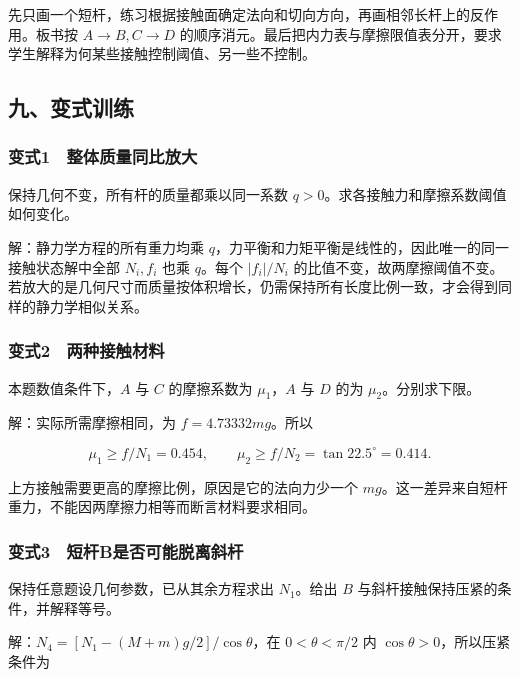 \documentclass[12pt,a4paper,fontset=fandol]{ctexart}
\begin{document}
先只画一个短杆，练习根据接触面确定法向和切向方向，再画相邻长杆上的反作用。板书按
\(A\to B,C\to D\)
的顺序消元。最后把内力表与摩擦限值表分开，要求学生解释为何某些接触控制阈值、另一些不控制。

\subsection{九、变式训练}\label{ux4e5dux53d8ux5f0fux8badux7ec3-3}

\subsubsection{变式1　整体质量同比放大}\label{ux53d8ux5f0f1-ux6574ux4f53ux8d28ux91cfux540cux6bd4ux653eux5927}

保持几何不变，所有杆的质量都乘以同一系数
\(q>0\)。求各接触力和摩擦系数阈值如何变化。

解：静力学方程的所有重力均乘
\(q\)，力平衡和力矩平衡是线性的，因此唯一的同一接触状态解中全部
\(N_i,f_i\) 也乘 \(q\)。每个 \(|f_i|/N_i\)
的比值不变，故两摩擦阈值不变。若放大的是几何尺寸而质量按体积增长，仍需保持所有长度比例一致，才会得到同样的静力学相似关系。

\subsubsection{变式2　两种接触材料}\label{ux53d8ux5f0f2-ux4e24ux79cdux63a5ux89e6ux6750ux6599}

本题数值条件下，\(A\) 与 \(C\) 的摩擦系数为 \(\mu_1\)，\(A\) 与 \(D\)
的为 \(\mu_2\)。分别求下限。

解：实际所需摩擦相同，为 \(f=4.73332mg\)。所以

\[\mu_1\ge f/N_1=0.454,\qquad
\mu_2\ge f/N_2=\tan22.5^\circ=0.414.\]

上方接触需要更高的摩擦比例，原因是它的法向力少一个
\(mg\)。这一差异来自短杆重力，不能因两摩擦力相等而断言材料要求相同。

\subsubsection{变式3　短杆B是否可能脱离斜杆}\label{ux53d8ux5f0f3-ux77edux6746bux662fux5426ux53efux80fdux8131ux79bbux659cux6746}

保持任意题设几何参数，已从其余方程求出 \(N_1\)。给出 \(B\)
与斜杆接触保持压紧的条件，并解释等号。

解：\(N_4=[N_1-(M+m)g/2]/\cos\theta\)，在 \(0<\theta<\pi/2\) 内
\(\cos\theta>0\)，所以压紧条件为
\end{document}
